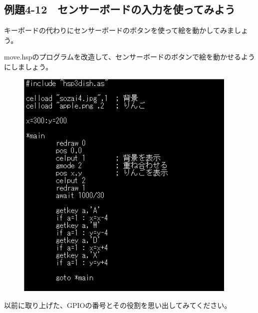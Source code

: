 \newpage
\subsection{例題4-12　センサーボードの入力を使ってみよう}


\begin{description}
    \item {}
\end{description}

キーボードの代わりにセンサーボードのボタンを使って絵を動かしてみましょう。

move.hspのプログラムを改造して、センサーボードのボタンで絵を動かせるようにしましょう。

\begin{figure}[H]
    \begin{center}
      \includegraphics[keepaspectratio,width=10.61cm,height=11.229cm]{text04-img/text04-img037.png}
    \end{center}
    \label{fig:prog_menu}
\end{figure}

\begin{description}
    \item {}
\end{description}

以前に取り上げた、GPIOの番号とその役割を思い出してみてください。


